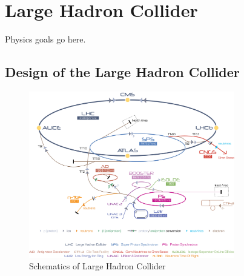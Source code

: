 
\chapter{Large Hadron Collider} %

\label{Chapter3} %



Physics goals go here.


\section{Design of the Large Hadron Collider}


\begin{figure}[htbp]
	\centering
		\includegraphics[width=0.8\textwidth]{Figures/LHC.jpg}
	\caption[Schematics of Large Hadron Collider]{Schematics of Large Hadron Collider}
	\label{fig:LHC}
\end{figure}

